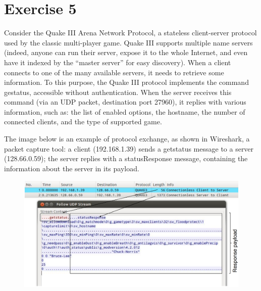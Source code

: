 \section{Exercise 5}

Consider the Quake III Arena Network Protocol, a stateless client-server protocol used by the classic multi-player game. 
Quake III supports multiple name servers (indeed, anyone can run their server, expose it to the whole Internet, and even have it indexed by the “master server” for easy discovery).
When a client connects to one of the many available servers, it needs to retrieve some information. 
To this purpose, the Quake III protocol implements the command gestatus, accessible without authentication.
When the server receives this command (via an UDP packet, destination port 27960), it replies with various information, such as: the list of enabled options, the hostname, the number of connected clients, and the type of supported game.

The image below is an example of protocol exchange, as shown in Wireshark, a packet capture tool: a client (192.168.1.39) sends a getstatus message to a server (128.66.0.59); the server replies with a statusResponse message, containing the information about the server in its payload.
\begin{figure}[H]
    \centering
    \includegraphics[width=0.75\linewidth]{images/net2.png}
\end{figure}

